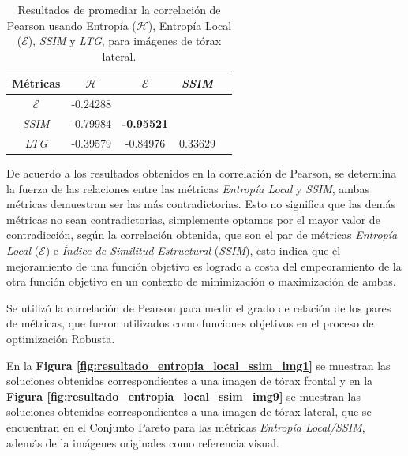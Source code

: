 \begin{table}[H]
\begin{center}
\caption{Resultados de promediar la correlación de Pearson usando Entropía ($\mathscr{H}$), Entropía Local ($\mathscr E$), \textit{SSIM} y \textit{LTG}, para imágenes de tórax lateral.}
\begin{tabular}{|c|c|c|c|c|}
            \hline
            Métricas & $\mathscr{H}$ & $\mathscr{E}$ & \textit{SSIM} \\
            \hline
            $\mathscr{E}$ & -0.24288  &  &   \\ \hline
            \textit{SSIM} & -0.79984 & \textbf{-0.95521} &  \\ \hline
            \textit{LTG} & -0.39579 & -0.84976 & 0.33629    \\ \hline
            \end{tabular}
\label{tabla:correlacionLateral}
\end{center}
\end{table}

De acuerdo a los resultados obtenidos en la correlación de Pearson, se determina la fuerza de las relaciones entre las métricas \textit{Entropía Local} y \textit{SSIM}, ambas métricas demuestran ser las más contradictorias. Esto no significa que las demás métricas no sean contradictorias, simplemente optamos por el mayor valor de contradicción, según la correlación obtenida, que son el par de métricas \textit{Entropía Local} ($\mathscr{E}$) e \textit{Índice de Similitud Estructural} (\textit{SSIM}), esto indica que el mejoramiento de una función objetivo es logrado a costa del empeoramiento de la otra función objetivo en un contexto de minimización o maximización de ambas.

Se utilizó la correlación de Pearson para medir el grado de relación  de los pares de métricas, que fueron utilizados como funciones objetivos en el proceso de optimización Robusta.


En la \textbf{Figura  \ref{fig:resultado_entropia_local_ssim_img1}} se muestran las soluciones obtenidas correspondientes a una imagen de tórax frontal y en la \textbf{Figura  \ref{fig:resultado_entropia_local_ssim_img9}} se muestran las soluciones obtenidas correspondientes a una imagen de tórax lateral, que se encuentran en el Conjunto Pareto para las métricas {\it Entropía Local/SSIM}, además de la imágenes originales como referencia visual.

